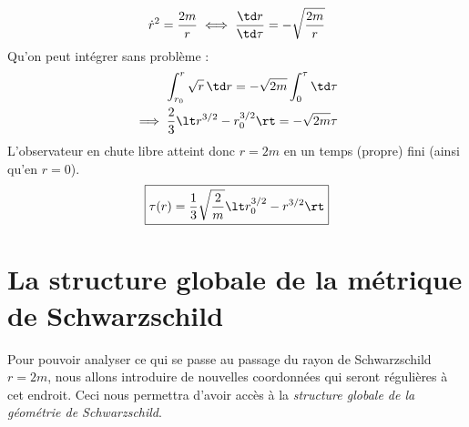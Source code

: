 \begin{equation}
    \dot{r}^2 = \frac{2m}{r} \iff \frac{\td r}{\td \tau} = - \sqrt{\frac{2m}{r}}
\end{equation}
Qu'on peut intégrer sans problème :
\begin{align}
    \int_{r_0}^r \sqrt{r}\, \td r = - \sqrt{2m} \int_0^\tau \td \tau\\
    \implies \frac{2}{3} \lt r^{3/2} - r_0^{3/2} \rt = - \sqrt{2m} \tau
\end{align}
L'observateur en chute libre atteint donc $r=2m$ en un temps (propre) fini (ainsi qu'en $r=0$).
\begin{equation}
    \boxed{\tau (r) = \frac{1}{3} \sqrt{\frac{2}{m}} \lt r_0^{3/2} -r^{3/2}\rt}
\end{equation}
\section{La structure globale de la métrique de Schwarzschild}
Pour pouvoir analyser ce qui se passe au passage du rayon de Schwarzschild $r=2m$, nous allons introduire de nouvelles coordonnées qui seront régulières à cet endroit. Ceci nous permettra d'avoir accès à la \emph{structure globale de la géométrie de Schwarzschild}.
